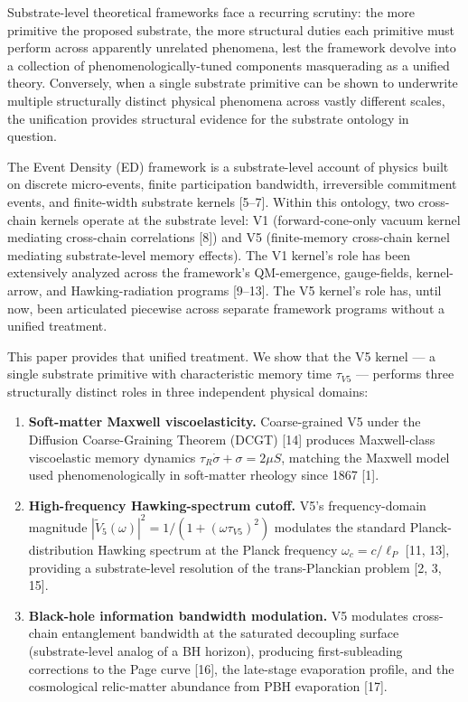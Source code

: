\documentclass[11pt,a4paper]{article}
\begin{document}
Substrate-level theoretical frameworks face a recurring scrutiny: the more primitive the proposed substrate, the more structural duties each primitive must perform across apparently unrelated phenomena, lest the framework devolve into a collection of phenomenologically-tuned components masquerading as a unified theory. Conversely, when a single substrate primitive can be shown to underwrite multiple structurally distinct physical phenomena across vastly different scales, the unification provides structural evidence for the substrate ontology in question.

The Event Density (ED) framework is a substrate-level account of physics built on discrete micro-events, finite participation bandwidth, irreversible commitment events, and finite-width substrate kernels [5--7]. Within this ontology, two cross-chain kernels operate at the substrate level: V1 (forward-cone-only vacuum kernel mediating cross-chain correlations [8]) and V5 (finite-memory cross-chain kernel mediating substrate-level memory effects). The V1 kernel's role has been extensively analyzed across the framework's QM-emergence, gauge-fields, kernel-arrow, and Hawking-radiation programs [9--13]. The V5 kernel's role has, until now, been articulated piecewise across separate framework programs without a unified treatment.

This paper provides that unified treatment. We show that the V5 kernel --- a single substrate primitive with characteristic memory time $\tau_{V5}$ --- performs three structurally distinct roles in three independent physical domains:

\begin{enumerate}[noitemsep]
\item \textbf{Soft-matter Maxwell viscoelasticity.} Coarse-grained V5 under the Diffusion Coarse-Graining Theorem (DCGT) [14] produces Maxwell-class viscoelastic memory dynamics $\tau_R \dot\sigma + \sigma = 2\mu S$, matching the Maxwell model used phenomenologically in soft-matter rheology since 1867 [1].
\item \textbf{High-frequency Hawking-spectrum cutoff.} V5's frequency-domain magnitude $|\tilde V_5(\omega)|^{2} = 1/(1+(\omega\tau_{V5})^{2})$ modulates the standard Planck-distribution Hawking spectrum at the Planck frequency $\omega_c = c/\ell_P$ [11, 13], providing a substrate-level resolution of the trans-Planckian problem [2, 3, 15].
\item \textbf{Black-hole information bandwidth modulation.} V5 modulates cross-chain entanglement bandwidth at the saturated decoupling surface (substrate-level analog of a BH horizon), producing first-subleading corrections to the Page curve [16], the late-stage evaporation profile, and the cosmological relic-matter abundance from PBH evaporation [17].
\end{enumerate}
\end{document}
